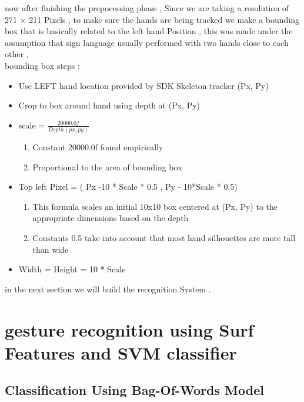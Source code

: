 now after finishing  the prepocessing phase , Since we are taking a resolution of 271 $\times$ 211 Pixels , to make sure the hands are being tracked we make a bounding box that is basically related to the left hand Position , this was made under the assumption that sign language  usually performed with two hands close to each other , \\
bounding box steps : \\

\begin{itemize}
\item  Use LEFT hand location provided by SDK Skeleton  tracker (Px, Py)
 \item Crop to box around hand using depth at (Px, Py)
    \item scale = $\frac{20000.0f}{Depth(px,py)}$ 
    \begin{enumerate}
    \item Constant 20000.0f  found empirically
    \item Proportional to the area of bounding box 
    \end{enumerate}
\item Top left Pixel  = ( Px -10 * Scale * 0.5  , Py - 10*Scale * 0.5)
\begin{enumerate}
    \item This formula scales an initial 10x10 box centered at (Px, Py) to
the appropriate dimensions based on the depth 
    \item Constants 0.5  take into account that most hand
silhouettes are more tall than wide 
    \end{enumerate}
   \item Width = Height = 10 * Scale 
\end{itemize}

in the next section we will build the recognition System  .

\section{ gesture recognition using Surf  Features  and SVM  classifier }

\subsection{ Classification Using Bag-Of-Words Model}

